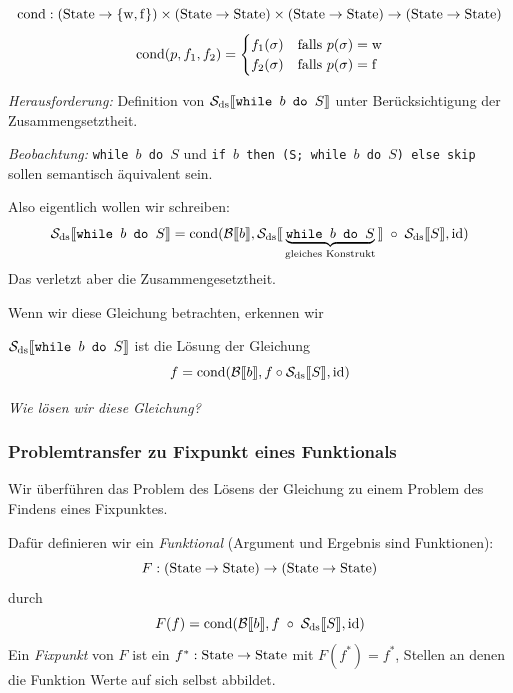 \begin{definition}[cond] \label{def:cond}
    \[
        \cond : (\State \to \bool) \times (\State \to \State) \times (\State \to \State) \to (\State \to \State)
    \]
    \[
        \cond(p, f_1, f_2) = \begin{cases}
            f_1(\sigma) & \text{falls } p(\sigma) = \true \\
            f_2(\sigma) & \text{falls } p(\sigma) = \false
        \end{cases}
    \]
\end{definition}

\par\bigskip
\emph{Herausforderung:} Definition von $\Sdssem{\texttt{while $b$ do $S$}}$ unter Berücksichtigung der Zusammengsetztheit.

\emph{Beobachtung:} \texttt{while $b$ do $S$} und \texttt{if $b$ then (S; while $b$ do $S$) else skip} sollen semantisch äquivalent sein.

Also eigentlich wollen wir schreiben: \[
    \Sdssem{\texttt{while $b$ do $S$}} = \cond(\Bsem{b}, \Sdssem{\underbrace{\texttt{while $b$ do $S$}}_{\text{gleiches Konstrukt}}} \;\circ\; \Sdssem{S}, \id)
\]
Das verletzt aber die Zusammengesetztheit.

\par\medskip
Wenn wir diese Gleichung betrachten, erkennen wir
\begin{remark}[Erkenntnis]
    $\Sdssem{\texttt{while $b$ do $S$}}$ ist die Lösung der Gleichung \[
        f = \cond(\Bsem{b}, f \circ \Sdssem{S}, \id)
    \]
\end{remark}

\emph{Wie lösen wir diese Gleichung?}



\subsubsection{Problemtransfer zu Fixpunkt eines Funktionals}

Wir überführen das Problem des Lösens der Gleichung zu einem Problem des Findens eines Fixpunktes.

\begin{definition}[Funktional] \label{def:funktional}
    Dafür definieren wir ein \emph{Funktional} (Argument und Ergebnis sind Funktionen): \[
        F : (\State \to \State) \to (\State \to \State)
    \] durch \[
        F(f) = \cond(\Bsem{b}, f \;\circ\; \Sdssem{S}, \id)
    \]
    Ein \emph{Fixpunkt} von $F$ ist ein $f^* : \State \to \State$ mit $F(f^*) = f^*$, \dh{} Stellen an denen die Funktion Werte auf sich selbst abbildet.
\end{definition}

